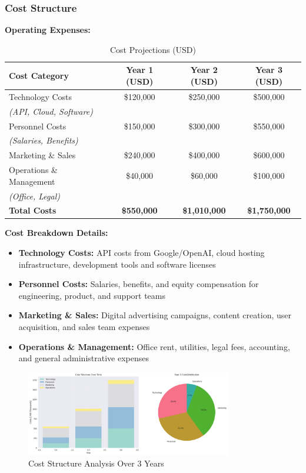 \subsubsection{Cost Structure}
\textbf{Operating Expenses:}
\begin{table}[h]
\centering
\begin{tabular}{|l|c|c|c|}
\hline
\textbf{Cost Category} & \textbf{Year 1 (USD)} & \textbf{Year 2 (USD)} & \textbf{Year 3 (USD)} \\
\hline
Technology Costs & \$120,000 & \$250,000 & \$500,000 \\
\textit{(API, Cloud, Software)} & & & \\
Personnel Costs & \$150,000 & \$300,000 & \$550,000 \\
\textit{(Salaries, Benefits)} & & & \\
Marketing \& Sales & \$240,000 & \$400,000 & \$600,000 \\
Operations \& Management & \$40,000 & \$60,000 & \$100,000 \\
\textit{(Office, Legal)} & & & \\
\hline
\textbf{Total Costs} & \textbf{\$550,000} & \textbf{\$1,010,000} & \textbf{\$1,750,000} \\
\hline
\end{tabular}
\caption{Cost Projections (USD)}
\end{table}

\textbf{Cost Breakdown Details:}
\begin{itemize}
    \item \textbf{Technology Costs:} API costs from Google/OpenAI, cloud hosting infrastructure, development tools and software licenses
    \item \textbf{Personnel Costs:} Salaries, benefits, and equity compensation for engineering, product, and support teams
    \item \textbf{Marketing \& Sales:} Digital advertising campaigns, content creation, user acquisition, and sales team expenses
    \item \textbf{Operations \& Management:} Office rent, utilities, legal fees, accounting, and general administrative expenses
\end{itemize}

\begin{figure}[h]
\centering
\includegraphics[width=0.8\textwidth]{graphics/cost_breakdown.png}
\caption{Cost Structure Analysis Over 3 Years}
\label{fig:cost_breakdown}
\end{figure}

